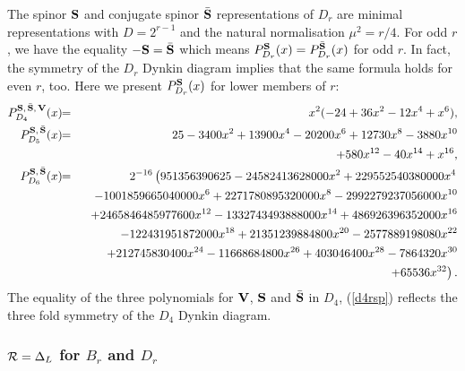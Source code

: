\documentclass[a4paper,12pt]{article}
\begin{document}
The spinor ${\bf S}$ and conjugate spinor $\bar{\bf S}$ representations
of $D_r$ are minimal representations with $D=2^{r-1}$ and the natural
normalisation $\mu^2=r/4$.
For odd $r$, we have the equality $-{\bf S}=\bar{\bf S}$ which means
$P_{D_{r}}^{\bf S}(x)=P_{D_{r}}^{\bar{\bf S}}(x)$ for odd $r$.
In fact, the symmetry of the $D_r$ Dynkin diagram implies that
the same formula holds for even $r$, too.
Here we present $P_{D_r}^{\bf S}(x)$ for lower members of $r$:
\begin{eqnarray}
   P_{D_{4}}^{{\bf S},\,\bar{\bf S},\,{\bf V}}(x)&\!\!=\!\!&
   x^2(-24+36x^2-12x^4+x^6),
   \label{d4rsp}\\
%
   P_{D_{5}}^{{\bf S},\,\bar{\bf S}}(x)&\!\!=\!\!&
   25-3400x^2+13900x^4-20200x^6+12730x^8-3880x^{10}\nonumber\\
   &&\quad +580x^{12}-40x^{14}+x^{16},\\
%
   P_{D_{6}}^{{\bf S},\,\bar{\bf S}}(x)&\!\!=\!\!&2^{-16}
   \left(951356390625-24582413628000x^2+229552540380000x^4\right.\nonumber\\
   &&\quad -1001859665040000x^6+2271780895320000x^8-2992279237056000x^{10}
   \nonumber\\
   &&\quad +2465846485977600x^{12}-1332743493888000x^{14}+486926396352000x^{16}
   \nonumber\\
   &&\quad -122431951872000x^{18}+21351239884800x^{20}-2577889198080x^{22}
   \nonumber\\
   &&\quad +212745830400x^{24}-11668684800x^{26}+403046400x^{28}-7864320x^{30}
   \nonumber\\
   &&\quad\left. +65536x^{32}\right).
\end{eqnarray}
The equality of the three polynomials for ${\bf V}$, ${\bf S}$ and
$\bar{\bf S}$ in $D_4$, (\ref{d4rsp}) reflects the three fold symmetry of
the $D_4$ Dynkin diagram.

\subsubsection{${\cal R}={\Delta_L}$ for $B_r$ and $D_r$}
\label{brrdell}
\end{document}
